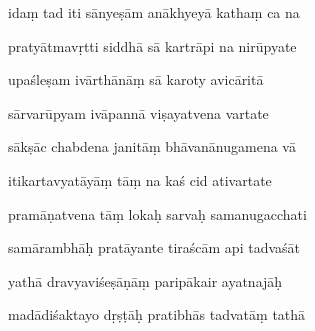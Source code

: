 \documentclass[article,12pt,a4paper]{memoir}%
\newcounter{parCount}
\begin{document}
	  
	  \pstart {} idaṃ tad iti sānyeṣām anākhyeyā kathaṃ ca na 
	{}
	\pend%
      

	  
	  \pstart \leavevmode%
	pratyātmavṛtti siddhā sā kartrāpi na nirūpyate 
	{}
	\pend%
      

	  
	  \pstart {} upaśleṣam ivārthānāṃ sā karoty avicāritā 
	{}
	\pend%
      

	  
	  \pstart \leavevmode%
	sārvarūpyam ivāpannā viṣayatvena vartate 
	{}
	\pend%
      

	  
	  \pstart {} sākṣāc chabdena janitāṃ bhāvanānugamena vā 
	{}
	\pend%
      

	  
	  \pstart \leavevmode%
	itikartavyatāyāṃ tāṃ na kaś cid ativartate 
	{}
	\pend%
      

	  
	  \pstart {} pramāṇatvena tāṃ lokaḥ sarvaḥ samanugacchati 
	{}
	\pend%
      

	  
	  \pstart \leavevmode%
	samārambhāḥ pratāyante tiraścām api tadvaśāt 
	{}
	\pend%
      

	  
	  \pstart {} yathā dravyaviśeṣāṇāṃ paripākair ayatnajāḥ 
	{}
	\pend%
      

	  
	  \pstart \leavevmode%
	madādiśaktayo dṛṣṭāḥ pratibhās tadvatāṃ tathā 
	{}
	\pend%
      
\end{document}
